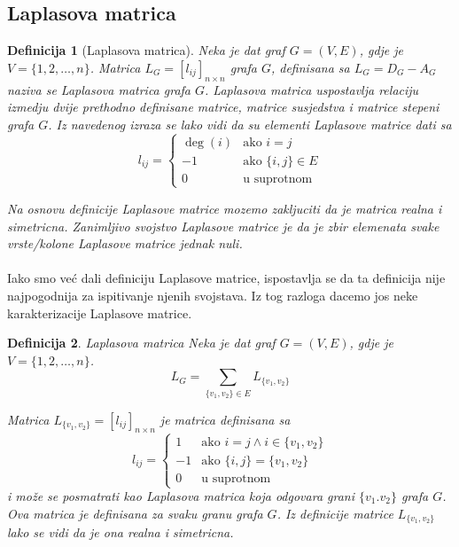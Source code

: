 \documentclass[11pt]{article}
\newtheorem{definition}{Definicija}
\begin{document}
		\subsection{Laplasova matrica}
	
			\begin{definition}[Laplasova matrica] 
			Neka je dat graf $G = (V, E)$, gdje je $V = \{1, 2, \dots, n\}$. Matrica $L_G = [l_{ij}]_{n \times n}$ grafa $G$, definisana sa $L_G = D_G - A_G$ naziva se Laplasova matrica grafa $G$.
			Laplasova matrica uspostavlja relaciju izmedju dvije prethodno definisane matrice, matrice susjedstva i matrice stepeni grafa $G$.
			Iz navedenog izraza se lako vidi da su elementi Laplasove matrice dati sa
			 \[
				 l_{ij} =
				 \begin{cases}
				 \deg(i)  & \text{ako } i = j \\
				 -1 & \text{ako } \{i, j\} \in E \\ 
				 0  & \text{u suprotnom}
				 \end{cases}
			 \]
			
			Na osnovu definicije Laplasove matrice mozemo zakljuciti da je matrica realna i simetricna.
			Zanimljivo svojstvo Laplasove matrice je da je zbir elemenata svake vrste/kolone Laplasove matrice jednak nuli.
			\end{definition}
	
			\paragraph{}
			Iako smo već dali definiciju Laplasove matrice, ispostavlja se da ta definicija nije najpogodnija za ispitivanje njenih svojstava. Iz tog razloga dacemo jos neke karakterizacije Laplasove matrice.
	
			\begin{definition}{Laplasova matrica}
			Neka je dat graf $G = (V, E)$, gdje je $V = \{1, 2, \dots, n\}$. 
			\[
				L_G = \sum_{\{v_1,v_2\} \in E} L_{\{v_1,v_2\}}
			\] 
			
			Matrica $L_{\{v_1,v_2\}} = [l_{ij}]_{n \times n}$ je matrica definisana sa
			\[
				 l_{ij} =
				 \begin{cases}
				 1  & \text{ako } i = j  \land i \in \{v_1,v_2\} \\
				 -1 & \text{ako } \{i,j\} = \{v_1,v_2\} \\ 
				 0  & \text{u suprotnom}
				 \end{cases}
			 \]
			i može se posmatrati kao Laplasova matrica koja odgovara grani $\{v_1.v_2\}$ grafa $G$. Ova matrica je definisana za svaku granu grafa $G$. Iz definicije matrice $L_{\{v_1,v_2\}}$ lako se vidi da je ona realna i 					simetricna.
			\end{definition}
			
\end{document}
